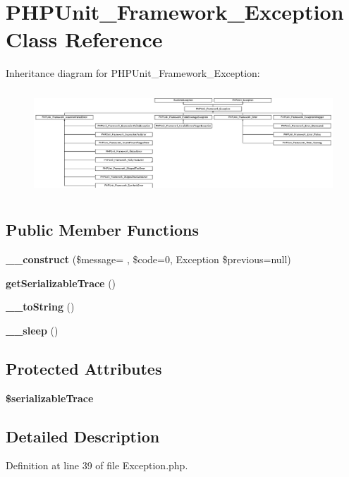 \section{P\+H\+P\+Unit\+\_\+\+Framework\+\_\+\+Exception Class Reference}
\label{class_p_h_p_unit___framework___exception}
Inheritance diagram for P\+H\+P\+Unit\+\_\+\+Framework\+\_\+\+Exception\+:\begin{figure}[H]
\begin{center}
\leavevmode
\includegraphics[height=3.948718cm]{class_p_h_p_unit___framework___exception}
\end{center}
\end{figure}
\subsection*{Public Member Functions}
\begin{DoxyCompactItemize}
\item 
{\bf \+\_\+\+\_\+construct} (\$message= \textquotesingle{}\textquotesingle{}, \$code=0, Exception \$previous=null)
\item 
{\bf get\+Serializable\+Trace} ()
\item 
{\bf \+\_\+\+\_\+to\+String} ()
\item 
{\bf \+\_\+\+\_\+sleep} ()
\end{DoxyCompactItemize}
\subsection*{Protected Attributes}
\begin{DoxyCompactItemize}
\item 
{\bf \$serializable\+Trace}
\end{DoxyCompactItemize}


\subsection{Detailed Description}


Definition at line 39 of file Exception.\+php.



